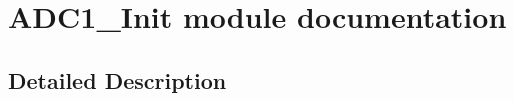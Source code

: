 \hypertarget{group___a_d_c1___init__module}{}\section{A\+D\+C1\+\_\+\+Init module documentation}
\label{group___a_d_c1___init__module}


\subsection{Detailed Description}
